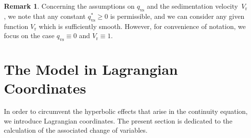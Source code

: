 \documentclass[10pt]{amsart}
\theoremstyle{plain}
\theoremstyle{definition}
\theoremstyle{thm}
\newtheorem{rem}[rem]{Remark}
\numberwithin{equation}{section}
\newcommand{\rr}{\mathrm{r}}
\newcommand{\rvs}{\mathrm{vs}}
\begin{document}
\begin{rem}\label{rem_ assu}
    { Concerning the assumptions on $q_\rvs$ and the sedimentation velocity~$V_\rr$, we note that any constant $q_\rvs^*\geq0$ is permissible, and we can consider any given function $V_\rr$ which is sufficiently smooth.
    However, for convenience of notation, we focus on the case $q_\rvs \equiv 0$ and $V_\rr \equiv 1$.} 
\end{rem}

\section{The Model in Lagrangian Coordinates}\label{sec:Lagrangian coords}

In order to circumvent the hyperbolic effects that arise in the continuity equation, we introduce Lagrangian coordinates.
The present section is dedicated to the calculation of the associated change of variables.
\end{document}
